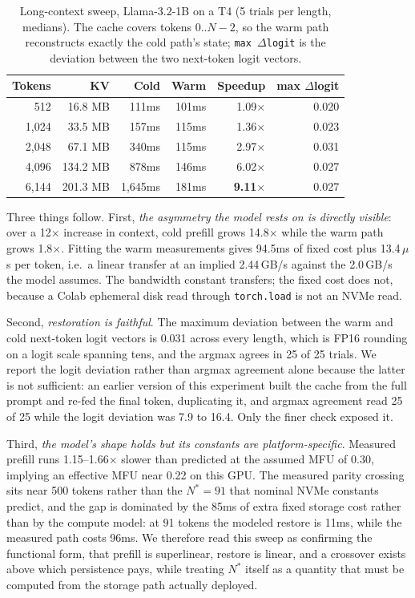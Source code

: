 \documentclass[letterpaper,twocolumn,10pt]{article}
\begin{document}
\begin{table}[t]
\centering
\caption{Long-context sweep, Llama-3.2-1B on a T4 (5 trials per length, medians). The cache covers tokens $0..N{-}2$, so the warm path reconstructs exactly the cold path's state; \texttt{max $\Delta$logit} is the deviation between the two next-token logit vectors.}
\label{tab:llamasweep}
\footnotesize
\setlength{\tabcolsep}{2.5pt}
\begin{tabular}{@{}rrrrrr@{}}
\toprule
Tokens & KV & Cold & Warm & Speedup & max $\Delta$logit \\
\midrule
512   & 16.8 MB  & 111ms  & 101ms & 1.09$\times$ & 0.020 \\
1,024 & 33.5 MB  & 157ms  & 115ms & 1.36$\times$ & 0.023 \\
2,048 & 67.1 MB  & 340ms  & 115ms & 2.97$\times$ & 0.031 \\
4,096 & 134.2 MB & 878ms  & 146ms & 6.02$\times$ & 0.027 \\
6,144 & 201.3 MB & 1,645ms & 181ms & \textbf{9.11}$\times$ & 0.027 \\
\bottomrule
\end{tabular}
\end{table}

Three things follow. First, \emph{the asymmetry the model rests on is directly visible}: over a 12$\times$ increase in context, cold prefill grows 14.8$\times$ while the warm path grows 1.8$\times$. Fitting the warm measurements gives 94.5ms of fixed cost plus 13.4\,$\mu$s per token, i.e.\ a linear transfer at an implied 2.44\,GB/s against the 2.0\,GB/s the model assumes. The bandwidth constant transfers; the fixed cost does not, because a Colab ephemeral disk read through \texttt{torch.load} is not an NVMe read.

Second, \emph{restoration is faithful}. The maximum deviation between the warm and cold next-token logit vectors is 0.031 across every length, which is FP16 rounding on a logit scale spanning tens, and the argmax agrees in 25 of 25 trials. We report the logit deviation rather than argmax agreement alone because the latter is not sufficient: an earlier version of this experiment built the cache from the full prompt and re-fed the final token, duplicating it, and argmax agreement read 25 of 25 while the logit deviation was 7.9 to 16.4. Only the finer check exposed it.

Third, \emph{the model's shape holds but its constants are platform-specific}. Measured prefill runs 1.15--1.66$\times$ slower than predicted at the assumed MFU of 0.30, implying an effective MFU near 0.22 on this GPU. The measured parity crossing sits near 500 tokens rather than the $N^{*}{=}91$ that nominal NVMe constants predict, and the gap is dominated by the 85ms of extra fixed storage cost rather than by the compute model: at 91 tokens the modeled restore is 11ms, while the measured path costs 96ms. We therefore read this sweep as confirming the functional form, that prefill is superlinear, restore is linear, and a crossover exists above which persistence pays, while treating $N^{*}$ itself as a quantity that must be computed from the storage path actually deployed.
\end{document}
